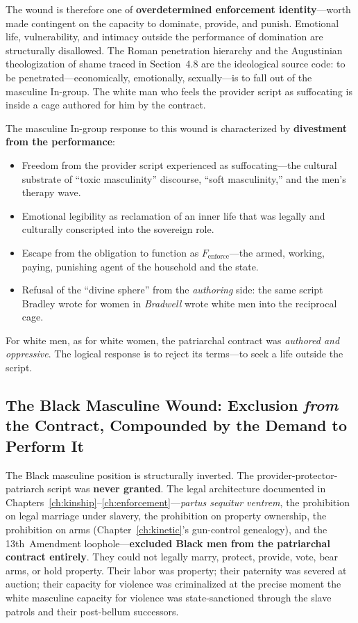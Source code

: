 The wound is therefore one of \textbf{overdetermined enforcement identity}---worth made contingent on the capacity to dominate, provide, and punish. Emotional life, vulnerability, and intimacy outside the performance of domination are structurally disallowed. The Roman penetration hierarchy and the Augustinian theologization of shame traced in Section~4.8 are the ideological source code: to be penetrated---economically, emotionally, sexually---is to fall out of the masculine In-group. The white man who feels the provider script as suffocating is inside a cage authored for him by the contract.

The masculine In-group response to this wound is characterized by \textbf{divestment from the performance}:

\begin{itemize}
    \item Freedom from the provider script experienced as suffocating---the cultural substrate of ``toxic masculinity'' discourse, ``soft masculinity,'' and the men's therapy wave.
    \item Emotional legibility as reclamation of an inner life that was legally and culturally conscripted into the sovereign role.
    \item Escape from the obligation to function as $F_{\text{enforce}}$---the armed, working, paying, punishing agent of the household and the state.
    \item Refusal of the ``divine sphere'' from the \textit{authoring} side: the same script Bradley wrote for women in \textit{Bradwell} wrote white men into the reciprocal cage.
\end{itemize}

For white men, as for white women, the patriarchal contract was \textit{authored and oppressive}. The logical response is to reject its terms---to seek a life outside the script.

\subsection{The Black Masculine Wound: Exclusion \textit{from} the Contract, Compounded by the Demand to Perform It}

The Black masculine position is structurally inverted. The provider-protector-patriarch script was \textbf{never granted}. The legal architecture documented in Chapters~\ref{ch:kinship}--\ref{ch:enforcement}---\textit{partus sequitur ventrem}, the prohibition on legal marriage under slavery, the prohibition on property ownership, the prohibition on arms (Chapter~\ref{ch:kinetic}'s gun-control genealogy), and the 13th~Amendment loophole---\textbf{excluded Black men from the patriarchal contract entirely}. They could not legally marry, protect, provide, vote, bear arms, or hold property. Their labor was property; their paternity was severed at auction; their capacity for violence was criminalized at the precise moment the white masculine capacity for violence was state-sanctioned through the slave patrols and their post-bellum successors.

